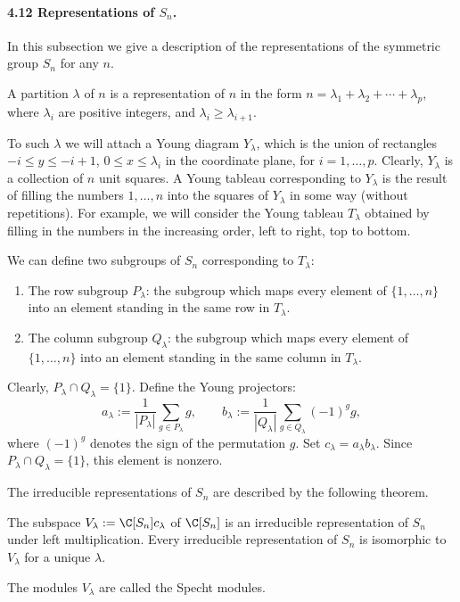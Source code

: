 
\paragraph{4.12 Representations of $S_n$.}
In this subsection we give a description of the representations of the symmetric group $S_n$ for any $n$.
\begin{definition}[4.35]
A partition $\lambda$ of $n$ is a representation of $n$ in the form $n=\lambda_1+\lambda_2+\cdots+\lambda_p$, where $\lambda_i$ are positive integers, and $\lambda_i\geq\lambda_{i+1}$.
\end{definition}
To such $\lambda$ we will attach a Young diagram $Y_\lambda$, which is the union of rectangles $-i\leq y\leq-i+1$, $0\leq x\leq\lambda_i$ in the coordinate plane, for $i=1,\ldots,p$. Clearly, $Y_\lambda$ is a collection of $n$ unit squares. A Young tableau corresponding to $Y_\lambda$ is the result of filling the numbers $1,\ldots,n$ into the squares of $Y_\lambda$ in some way (without repetitions). For example, we will consider the Young tableau $T_\lambda$ obtained by filling in the numbers in the increasing order, left to right, top to bottom.

We can define two subgroups of $S_n$ corresponding to $T_\lambda$:
\begin{enumerate}
\item The row subgroup $P_\lambda$: the subgroup which maps every element of $\{1,\ldots,n\}$ into an element standing in the same row in $T_\lambda$.
\item The column subgroup $Q_\lambda$: the subgroup which maps every element of $\{1,\ldots,n\}$ into an element standing in the same column in $T_\lambda$.
\end{enumerate}
Clearly, $P_\lambda\cap Q_\lambda=\{1\}$. Define the Young projectors:
\[
a_\lambda:=\frac1{|P_\lambda|}\sum_{g\in P_\lambda}g,\qquad
b_\lambda:=\frac1{|Q_\lambda|}\sum_{g\in Q_\lambda}(-1)^g g,
\]
where $(-1)^g$ denotes the sign of the permutation $g$. Set $c_\lambda=a_\lambda b_\lambda$. Since $P_\lambda\cap Q_\lambda=\{1\}$, this element is nonzero.

The irreducible representations of $S_n$ are described by the following theorem.
\begin{theorem}[4.36]
The subspace $V_\lambda:=\C[S_n]c_\lambda$ of $\C[S_n]$ is an irreducible representation of $S_n$ under left multiplication. Every irreducible representation of $S_n$ is isomorphic to $V_\lambda$ for a unique $\lambda$.
\end{theorem}
The modules $V_\lambda$ are called the Specht modules.

